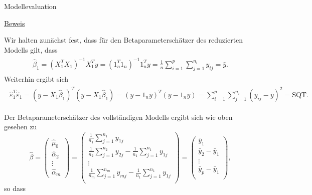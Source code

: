 \documentclass[
  8pt,
  ignorenonframetext,
]{beamer}
\begin{document}
\begin{frame}{Modellevaluation}
\protect\hypertarget{modellevaluation-7}{}
\footnotesize

\underline{Beweis}

Wir halten zunächst fest, dass für den Betaparameterschätzer des
reduzierten Modells gilt, dass \begin{align}
\begin{split}
\hat{\beta}_1
= (X_1^TX_1)^{-1}X_1^Ty
= (1_n^T 1_n)^{-1}1_n^Ty
= \frac{1}{n} \sum_{i=1}^p \sum_{j = 1}^{n_i} y_{ij}
= \bar{y}.
\end{split}
\end{align} Weiterhin ergibt sich \begin{align}
\begin{split}
\hat{\varepsilon}_1^T \hat{\varepsilon}_1
= (y - X_1\hat{\beta}_1)^T(y - X_1\hat{\beta}_1)
= (y - 1_n\bar{y})^T(y - 1_n\bar{y})
= \sum_{i=1}^p \sum_{j=1}^{n_i} (y_{ij} - \bar{y})^2
= \mbox{SQT}.
\end{split}
\end{align}

Der Betaparameterschätzer des vollständigen Modells ergibt sich wie oben
gesehen zu \tiny \begin{equation}
\renewcommand{\arraystretch}{1.4}
\hat{\beta} =
\begin{pmatrix}
\hat{\mu}_0     \\
\hat{\alpha}_2  \\
\vdots          \\
\hat{\alpha}_m
\end{pmatrix}
=
\begin{pmatrix}
 \frac{1}{n_1}\sum_{j=1}^{n_1} y_{1j}   \\
 \frac{1}{n_2}\sum_{j=1}^{n_2} y_{2j}
-\frac{1}{n_1}\sum_{j=1}^{n_1} y_{1j}   \\
\vdots \\
 \frac{1}{n_m}\sum_{j=1}^{n_m} y_{mj}
-\frac{1}{n_1}\sum_{j=1}^{n_1} y_{1j}   \\
\end{pmatrix}
=
\begin{pmatrix}
\bar{y}_1                               \\
\bar{y}_2 - \bar{y}_1                   \\
\vdots                                  \\
\bar{y}_p - \bar{y}_1                   \\
\end{pmatrix},
\end{equation} \footnotesize so dass
\end{frame}
\end{document}
